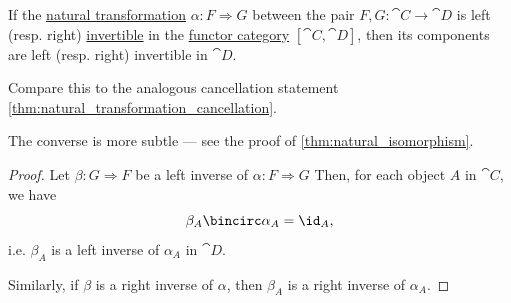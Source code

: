 \begin{proposition}\label{thm:natural_transformation_one_sided_invertibility}
  If the \hyperref[def:natural_transformation]{natural transformation} \( \alpha: F \Rightarrow G \) between the pair \( F, G: \cat{C} \to \cat{D} \) is left (resp. right) \hyperref[def:morphism_invertibility]{invertible} in the \hyperref[def:functor_category]{functor category} \( [\cat{C}, \cat{D}] \), then its components are left (resp. right) invertible in \( \cat{D} \).
\end{proposition}
\begin{comments}
  \item Compare this to the analogous cancellation statement \cref{thm:natural_transformation_cancellation}.
  \item The converse is more subtle --- see the proof of \cref{thm:natural_isomorphism}.
\end{comments}
\begin{proof}
  Let \( \beta: G \Rightarrow F \) be a left inverse of \( \alpha: F \Rightarrow G \) Then, for each object \( A \) in \( \cat{C} \), we have
  \begin{equation*}
    \beta_A \bincirc \alpha_A = \id_A,
  \end{equation*}
  i.e. \( \beta_A \) is a left inverse of \( \alpha_A \) in \( \cat{D} \).

  Similarly, if \( \beta \) is a right inverse of \( \alpha \), then \( \beta_A \) is a right inverse of \( \alpha_A \).
\end{proof}


